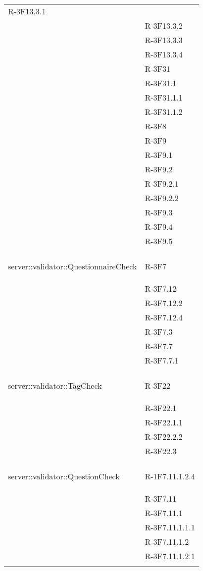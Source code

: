 \begin{longtable}{l p{3cm}}
	R-3F13.3.1 \tabularnewline &
	
	R-3F13.3.2 \tabularnewline &
	
	R-3F13.3.3 \tabularnewline &
	
	R-3F13.3.4 \tabularnewline &
	
	R-3F31 \tabularnewline &
	
	R-3F31.1 \tabularnewline &
	
	R-3F31.1.1 \tabularnewline &
	
	R-3F31.1.2 \tabularnewline &
	
	R-3F8 \tabularnewline &
	
	R-3F9 \tabularnewline &
	
	R-3F9.1 \tabularnewline &
	
	R-3F9.2 \tabularnewline &
	
	R-3F9.2.1 \tabularnewline &
	
	R-3F9.2.2 \tabularnewline &
	
	R-3F9.3 \tabularnewline &
	
	R-3F9.4 \tabularnewline &
	
	R-3F9.5 \tabularnewline &\tabularnewline
	\hline
	\hypertarget{server::validator::QuestionnaireCheck}{server::validator::QuestionnaireCheck} & R-3F7 \tabularnewline &
	
	R-3F7.12 \tabularnewline &
	
	R-3F7.12.2 \tabularnewline &
	
	R-3F7.12.4 \tabularnewline &
	
	R-3F7.3 \tabularnewline &
	
	R-3F7.7 \tabularnewline &
	
	R-3F7.7.1 \tabularnewline &\tabularnewline
	\hline
	\hypertarget{server::validator::TagCheck}{server::validator::TagCheck} & R-3F22 \tabularnewline &
	
	R-3F22.1 \tabularnewline &
	
	R-3F22.1.1 \tabularnewline &
	
	R-3F22.2.2 \tabularnewline &
	
	R-3F22.3 \tabularnewline &\tabularnewline
	\hline
	\hypertarget{server::validator::QuestionCheck}{server::validator::QuestionCheck} & R-1F7.11.1.2.4 \tabularnewline &
	
	R-3F7.11 \tabularnewline &
	
	R-3F7.11.1 \tabularnewline &
	
	R-3F7.11.1.1.1 \tabularnewline &
	
	R-3F7.11.1.2 \tabularnewline &
	
	R-3F7.11.1.2.1 \tabularnewline &
	

\end{longtable}
